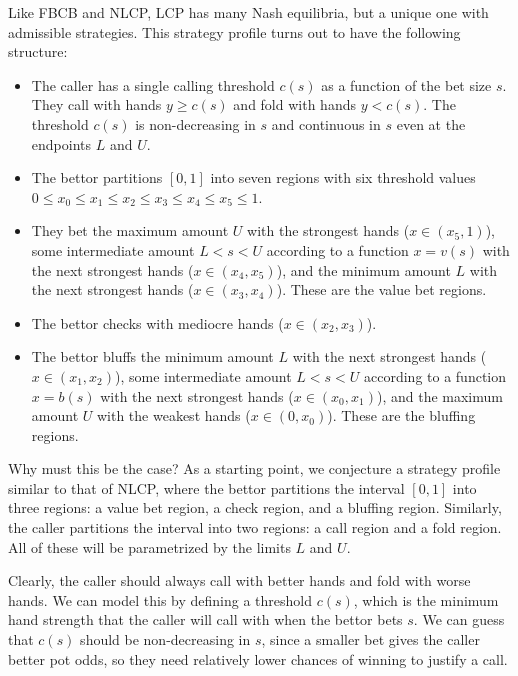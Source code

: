 \documentclass[a4paper,12pt]{article}
\theoremstyle{plain}
\theoremstyle{definition}
\begin{document}

\label{subsec:nash_equilibrium_structure}
Like FBCB and NLCP, LCP has many Nash equilibria, but a unique one with admissible strategies. This strategy profile turns out to have the following structure:

\begin{itemize}
    \item The caller has a single calling threshold $c(s)$ as a function of the bet size $s$. They call with hands $y \geq c(s)$ and fold with hands $y < c(s)$. The threshold $c(s)$ is non-decreasing in $s$ and continuous in $s$ even at the endpoints $L$ and $U$.
    \item The bettor partitions $[0, 1]$ into seven regions with six threshold values $0 \leq x_0\leq x_1\leq x_2\leq x_3 \leq x_4 \leq x_5 \leq 1$. 
    \item They bet the maximum amount $U$ with the strongest hands ($x \in (x_5, 1)$), some intermediate amount $L < s < U$ according to a function $x = v(s)$ with the next strongest hands ($x \in (x_4, x_5)$), and the minimum amount $L$ with the next strongest hands ($x \in (x_3, x_4)$). These are the value bet regions.
    \item The bettor checks with mediocre hands ($x \in (x_2, x_3)$).
    \item The bettor bluffs the minimum amount $L$ with the next strongest hands ($x \in (x_1, x_2)$), some intermediate amount $L < s < U$ according to a function $x = b(s)$ with the next strongest hands ($x \in (x_0, x_1)$), and the maximum amount $U$ with the weakest hands ($x \in (0, x_0)$). These are the bluffing regions.
\end{itemize}

Why must this be the case? As a starting point, we conjecture a strategy profile similar to that of NLCP, where the bettor partitions the interval $[0, 1]$ into three regions: a value bet region, a check region, and a bluffing region. Similarly, the caller partitions the interval into two regions: a call region and a fold region. All of these will be parametrized by the limits $L$ and $U$. 

Clearly, the caller should always call with better hands and fold with worse hands.  We can model this by defining a threshold $c(s)$, which is the minimum hand strength that the caller will call with when the bettor bets $s$. We can guess that $c(s)$ should be non-decreasing in $s$, since a smaller bet gives the caller better pot odds, so they need relatively lower chances of winning to justify a call.
\end{document}
